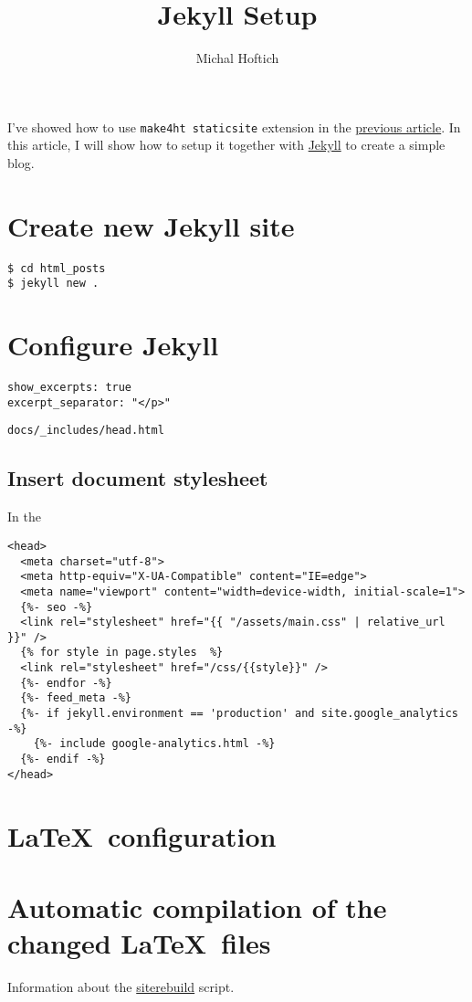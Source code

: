 \documentclass{article}
\title{Jekyll Setup}
\author{Michal Hoftich}
\def\makeht{\texttt{make4ht}}
\begin{document}
\maketitle

I've showed how to use \makeht\ \texttt{staticsite} extension
in the \href{/testblog/2021/07/30/how-to-blog-with-tex4ht.html}
{previous article}. In this article, I will show how to 
setup it together with \href{https://jekyllrb.com/}{Jekyll}
to create a simple blog.

\tableofcontents

\section{Create new Jekyll site}


\begin{verbatim}
$ cd html_posts
$ jekyll new .
\end{verbatim}



\section{Configure Jekyll}
\begin{verbatim}
show_excerpts: true
excerpt_separator: "</p>"
\end{verbatim}


\begin{verbatim}
docs/_includes/head.html
\end{verbatim}

\subsection{Insert document stylesheet}

In the \texttt{}

\begin{verbatim}
<head>
  <meta charset="utf-8">
  <meta http-equiv="X-UA-Compatible" content="IE=edge">
  <meta name="viewport" content="width=device-width, initial-scale=1">
  {%- seo -%}
  <link rel="stylesheet" href="{{ "/assets/main.css" | relative_url }}" />
  {% for style in page.styles  %}
  <link rel="stylesheet" href="/css/{{style}}" />
  {%- endfor -%}
  {%- feed_meta -%}
  {%- if jekyll.environment == 'production' and site.google_analytics -%}
    {%- include google-analytics.html -%}
  {%- endif -%}
</head>
\end{verbatim}

\section{\LaTeX\ configuration}

\section{Automatic compilation of the changed \LaTeX\ files}

Information about the \href{https://github.com/michal-h21/siterebuild}{siterebuild} script.
\end{document}
